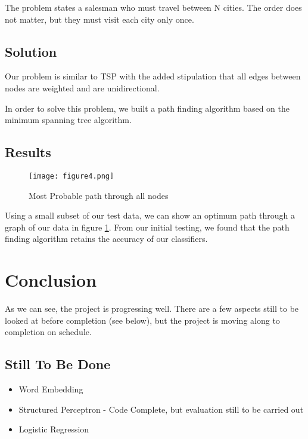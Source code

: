 \documentclass[12pt]{report}
\begin{document}
The problem states a salesman who must travel between N  cities. The order does not matter,
but they must visit each city only once.

\section{Solution}
Our problem is similar to TSP with the added stipulation that all edges between nodes are weighted
and are unidirectional.

In order to solve this problem, we built a path finding algorithm based on the minimum spanning tree
algorithm.


\section{Results}
\begin{figure}[h]
  \centering
  \texttt{[image: figure4.png]}
  \label{figure:graph}
  \caption{Most Probable path through all nodes}
\end{figure}

Using a small subset of our test data, we can show an optimum path through a graph of our data in
figure \ref{figure:graph}. From our initial testing, we found that the path finding algorithm retains
the accuracy of our classifiers.

\chapter{Conclusion}
As we can see, the project is progressing well.
There are a few aspects still to be looked at before completion (see below), but the project is moving
along to completion on schedule.


\section{Still To Be Done}
\begin{itemize}
\item Word Embedding
\item Structured Perceptron - Code Complete, but evaluation still to be carried out
\item Logistic Regression
  \end{itemize}

{}
\end{document}
